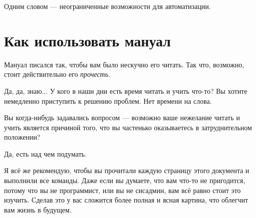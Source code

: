 Одним словом --- неограниченные возможности для автоматизации.

\section{Как использовать мануал}

Мануал писался так, чтобы вам было нескучно его читать. Так что, возможно,
стоит действительно его \emph{прочесть}.

Да, да, знаю... У кого в наши дни есть время читать и учить что-то? Вы хотите
немедленно приступить к решению проблем. Нет времени на слова.

Вы когда-нибудь задавались вопросом --- возможно ваше нежелание читать и учить
является причиной того, что вы частенько оказываетесь в затруднительном положении?

Да, есть над чем подумать.

Я всё же рекомендую, чтобы вы прочитали каждую страницу этого документа и
выполнили все команды. Даже если вы думаете, что вам что-то не пригодится,
потому что вы не программист, или вы не сисадмин, вам всё равно стоит это
изучить. Сделав это у вас сложится более полная и ясная картина, что облегчит
вам жизнь в будущем.
